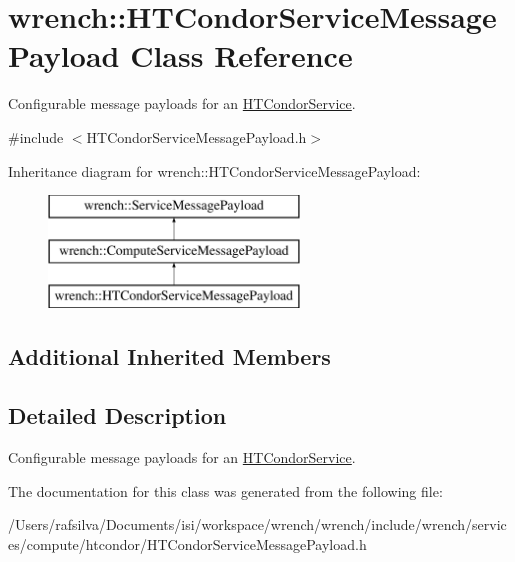 \hypertarget{classwrench_1_1_h_t_condor_service_message_payload}{}\section{wrench\+:\+:H\+T\+Condor\+Service\+Message\+Payload Class Reference}
\label{classwrench_1_1_h_t_condor_service_message_payload}


Configurable message payloads for an \hyperlink{classwrench_1_1_h_t_condor_service}{H\+T\+Condor\+Service}.  




{\ttfamily \#include $<$H\+T\+Condor\+Service\+Message\+Payload.\+h$>$}

Inheritance diagram for wrench\+:\+:H\+T\+Condor\+Service\+Message\+Payload\+:\begin{figure}[H]
\begin{center}
\leavevmode
\includegraphics[height=3.000000cm]{classwrench_1_1_h_t_condor_service_message_payload}
\end{center}
\end{figure}
\subsection*{Additional Inherited Members}


\subsection{Detailed Description}
Configurable message payloads for an \hyperlink{classwrench_1_1_h_t_condor_service}{H\+T\+Condor\+Service}. 

The documentation for this class was generated from the following file\+:\begin{DoxyCompactItemize}
\item 
/\+Users/rafsilva/\+Documents/isi/workspace/wrench/wrench/include/wrench/services/compute/htcondor/H\+T\+Condor\+Service\+Message\+Payload.\+h\end{DoxyCompactItemize}
